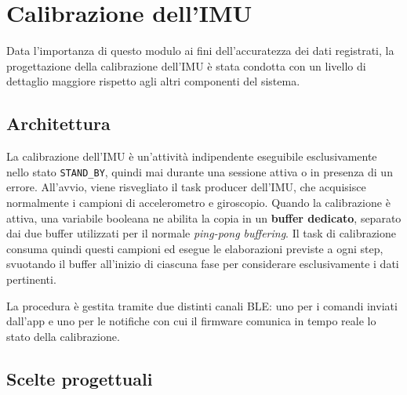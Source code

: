 \section{Calibrazione dell'IMU}
Data l'importanza di questo modulo ai fini dell'accuratezza dei dati registrati, la progettazione della calibrazione dell'IMU è stata condotta con 
un livello di dettaglio maggiore rispetto agli altri componenti del sistema.

\subsection{Architettura}

La calibrazione dell'IMU è un'attività indipendente eseguibile esclusivamente nello stato \texttt{STAND\_BY}, quindi mai durante una sessione attiva o in 
presenza di un errore. All'avvio, viene risvegliato il task producer dell'IMU, che acquisisce normalmente i campioni di accelerometro e giroscopio. Quando 
la calibrazione è attiva, una variabile booleana ne abilita la copia in un \textbf{buffer dedicato}, separato dai due buffer utilizzati per il normale 
\textit{ping-pong buffering}. Il task di calibrazione consuma quindi questi campioni ed esegue le elaborazioni previste a ogni step, svuotando il buffer 
all'inizio di ciascuna fase per considerare esclusivamente i dati pertinenti.

La procedura è gestita tramite due distinti canali BLE: uno per i comandi inviati dall'app e uno per le notifiche con cui il firmware comunica in tempo 
reale lo stato della calibrazione.

\subsection{Scelte progettuali}

